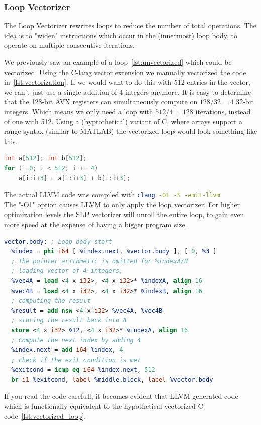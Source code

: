 \subsubsection{Loop Vectorizer}

The Loop Vectorizer rewrites loops to reduce the number of total operations.
The idea is to "widen" instructions which occur in the (innermost) loop body,
to operate on multiple consecutive iterations.

We previously saw an example of a loop~\ref{lst:unvectorized} which could be vectorized.
Using the C-lang vector extension we manually vectorized the code in~\ref{lst:vectorization}. If we would
want to do this with 512 entries in the vector, we can't just use a single addition of 4 integers anymore.
It is easy to determine that the 128-bit AVX registers can simultaneously compute on $128/32 = 4$ 32-bit integers.
Which means we only need a loop with $512 / 4 = 128$ iterations, instead of one with 512.
Using a (hyptothetical) variant of C, where arrays support a range syntax (similar to MATLAB) 
the vectorized loop would look something like this.
\begin{lstlisting}[language=C,label={lst:vectorized_loop}]
int a[512]; int b[512];
for (i=0; i < 512; i += 4)
    a[i:i+3] = a[i:i+3] + b[i:i+3];
\end{lstlisting}

The actual LLVM code was compiled with \lstinline[language=bash]{clang -O1 -S -emit-llvm}\\
The "-O1" option causes LLVM to only apply the loop vectorizer. For higher optimization levels the SLP vectorizer
will unroll the entire loop, to gain even more speed at the expense of having a bigger program size.
\begin{lstlisting}[language=LLVM]
vector.body: ; Loop body start
  %index = phi i64 [ %index.next, %vector.body ], [ 0, %3 ]
  ; The pointer arithmetic is omitted for %indexA/B
  ; loading vector of 4 integers, 
  %vec4A = load <4 x i32>, <4 x i32>* %indexA, align 16
  %vec4B = load <4 x i32>, <4 x i32>* %indexB, align 16
  ; computing the result
  %result = add nsw <4 x i32> %vec4A, %vec4B
  ; storing the result back into A
  store <4 x i32> %12, <4 x i32>* %indexA, align 16
  ; Compute the next index by adding 4
  %index.next = add i64 %index, 4
  ; check if the exit condition is met
  %exitcond = icmp eq i64 %index.next, 512
  br i1 %exitcond, label %middle.block, label %vector.body
\end{lstlisting}
If you read the code carefull, it becomes evident that LLVM generated code which is functionally equivalent
to the hypothetical vectorized C code~\ref{lst:vectorized_loop}.

